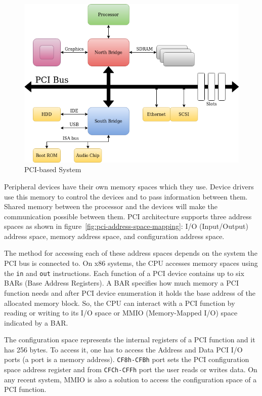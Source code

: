 \documentclass[12pt, a4paper]{report}
\begin{document}
\begin{figure}[H]
\centering
\includegraphics[width=\textwidth, keepaspectratio]{pics/pci-bus.png}
  \caption{PCI-based System}
  \label{fig:pci-bus}
\end{figure}

Peripheral devices have their own memory spaces which they use. Device drivers use this memory to control the devices and to pass information between them. Shared memory between the processor and the devices will make the communication possible between them\footnotemark. PCI architecture supports three address spaces as shown in figure~\ref{fig:pci-address-space-mapping}: I/O (Input/Output) address space, memory address space, and configuration address space.

The method for accessing each of these address spaces depends on the system the PCI bus is connected to. On x86 systems, the CPU accesses memory spaces using the \texttt{in} and \texttt{out} instructions. Each function of a PCI device contains up to six BARs (Base Address Registers). A BAR specifies how much memory a PCI function needs and after PCI device enumeration it holds the base address of the allocated memory block. So, the CPU can interact with a PCI function by reading or writing to its I/O space or MMIO (Memory-Mapped I/O) space indicated by a BAR.

The configuration space represents the internal registers of a PCI function and it has 256 bytes. To access it, one has to access the Address and Data PCI I/O ports (a port is a memory address). \texttt{CF8h-CFBh} port sets the PCI configuration space address register and from \texttt{CFCh-CFFh} port the user reads or writes data. On any recent system, MMIO is also a solution to access the configuration space of a PCI function.
\end{document}

